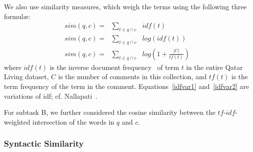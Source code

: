 We also use similarity measures, which weigh the terms
using the following three formul\ae: 
%
\begin{align}
sim(q,c) = &
	\sum_{t\in q\cap c} & idf(t) \enspace		\\
sim(q,c) = & \sum_{t\in q\cap c} & log(idf(t)) \label{idfvar1}\\
sim(q,c) = & \sum_{t\in q\cap c} & log\left(1 + \frac{|C|}{tf(t)}\right) \label{idfvar2}
\end{align}
% 
where $idf(t)$ is the inverse document frequency~\cite{Jones:1972} of term $t$ 
in the entire Qatar Living dataset, $C$ is the number of comments in this collection, 
and $tf(t)$ is the term frequency of the term in the comment. 
Equations~\ref{idfvar1} and~\ref{idfvar2} are variations of idf;
cf. Nallapati~.

For subtask B, we further considered 
the cosine similarity between the $tf$-$idf$-weighted intersection of the words in $q$ and $c$.


\subsubsection{Syntactic Similarity}
\label{sub:syntactic}

